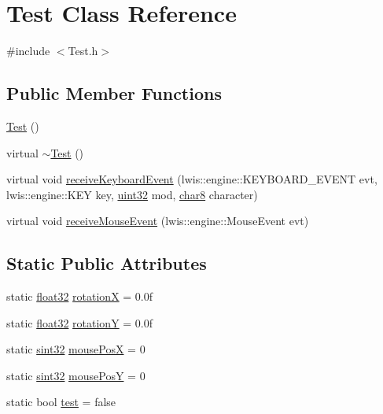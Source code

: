 \hypertarget{classTest}{
\section{Test Class Reference}
\label{classTest}
}


{\ttfamily \#include $<$Test.h$>$}

\subsection*{Public Member Functions}
\begin{DoxyCompactItemize}
\item 
\hyperlink{classTest_a99f2bbfac6c95612322b0f10e607ebe5}{Test} ()
\item 
virtual \hyperlink{classTest_a2b0a62f1e667bbe8d8cb18d785bfa991}{$\sim$Test} ()
\item 
virtual void \hyperlink{classTest_a6b72d13434fbfbfb20036efd2eddb582}{receiveKeyboardEvent} (lwis::engine::KEYBOARD\_\-EVENT evt, lwis::engine::KEY key, \hyperlink{namespacecompatibility_a51e8fe2956b4f39fe1fae96cec0d8393}{uint32} mod, \hyperlink{namespacecompatibility_a451d9cfd3da606a663aa298356f0b5a5}{char8} character)
\item 
virtual void \hyperlink{classTest_ac74ca5b6a96ae120f185eb74faa83426}{receiveMouseEvent} (lwis::engine::MouseEvent evt)
\end{DoxyCompactItemize}
\subsection*{Static Public Attributes}
\begin{DoxyCompactItemize}
\item 
static \hyperlink{namespacecompatibility_a32a2d006ac2172c0f859370287f0104c}{float32} \hyperlink{classTest_ab43ab44c8f4ce5505edefd22fa88dbfb}{rotationX} = 0.0f
\item 
static \hyperlink{namespacecompatibility_a32a2d006ac2172c0f859370287f0104c}{float32} \hyperlink{classTest_a718270463659bee4d58f84cd85afa1d8}{rotationY} = 0.0f
\item 
static \hyperlink{namespacecompatibility_afc3ea6dfbdda98c9d2615b235b140a18}{sint32} \hyperlink{classTest_a480574c4cb8a857e5e9abc688b268d57}{mousePosX} = 0
\item 
static \hyperlink{namespacecompatibility_afc3ea6dfbdda98c9d2615b235b140a18}{sint32} \hyperlink{classTest_a69548f4b03e9b8193e5f460dd339a71e}{mousePosY} = 0
\item 
static bool \hyperlink{classTest_ab9b7c96eff4aa942c802e282201d2bef}{test} = false
\end{DoxyCompactItemize}


